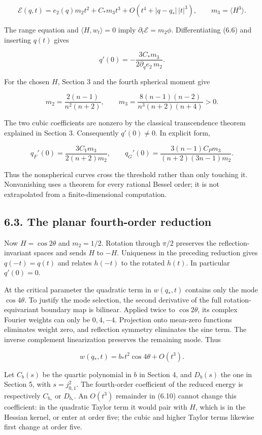 \documentclass[11pt]{article}
\begin{document}
\[
\mathcal E(q,t)=e_2(q)m_2t^2+C_*m_3t^3
+O(t^4+|q-q_*|\,|t|^3),\qquad m_3=\langle H^3\rangle.
\tag{6.6}
\]

The range equation and \(\langle H,w_t\rangle=0\) imply
\(\partial_t\mathcal E=m_2\phi\). Differentiating (6.6) and inserting
\(q(t)\) gives

\[
q'(0)=-\frac{3C_*m_3}{2\partial_q e_2\,m_2}.
\tag{6.7}
\]

For the chosen \(H\), Section 3 and the fourth spherical moment give

\[
m_2=\frac{2(n-1)}{n^2(n+2)},\qquad
m_3=\frac{8(n-1)(n-2)}{n^3(n+2)(n+4)}>0.
\tag{6.8}
\]

The two cubic coefficients are nonzero by the classical transcendence
theorem explained in Section 3. Consequently \(q'(0)\ne0\). In explicit
form,

\[
q_F'(0)=\frac{3C_Vm_3}{2(n+2)m_2},\qquad
q_G'(0)=\frac{3(n-1)C_Pm_3}{(n+2)(3n-1)m_2}.
\tag{6.9}
\]

Thus the nonspherical curves cross the threshold rather than only
touching it. Nonvanishing uses a theorem for every rational Bessel
order; it is not extrapolated from a finite-dimensional computation.

\subsection{6.3. The planar fourth-order
reduction}\label{the-planar-fourth-order-reduction}

Now \(H=\cos2\theta\) and \(m_2=1/2\). Rotation through \(\pi/2\)
preserves the reflection-invariant spaces and sends \(H\) to \(-H\).
Uniqueness in the preceding reduction gives \(q(-t)=q(t)\) and relates
\(h(-t)\) to the rotated \(h(t)\). In particular \(q'(0)=0\).

At the critical parameter the quadratic term in \(w(q_*,t)\) contains
only the mode \(\cos4\theta\). To justify the mode selection, the second
derivative of the full rotation-equivariant boundary map is bilinear.
Applied twice to \(\cos2\theta\), its complex Fourier weights can only
be \(0,4,-4\). Projection onto mean-zero functions eliminates weight
zero, and reflection symmetry eliminates the sine term. The inverse
complement linearization preserves the remaining mode. Thus

\[
w(q_*,t)=b_*t^2\cos4\theta+O(t^3).
\tag{6.10}
\]

Let \(C_b(s)\) be the quartic polynomial in \(b\) in Section 4, and
\(D_b(s)\) the one in Section 5, with \(s=j_{0,1}^2\). The fourth-order
coefficient of the reduced energy is respectively \(C_{b_*}\) or
\(D_{b_*}\). An \(O(t^3)\) remainder in (6.10) cannot change this
coefficient: in the quadratic Taylor term it would pair with \(H\),
which is in the Hessian kernel, or enter at order five; the cubic and
higher Taylor terms likewise first change at order five.
\end{document}
